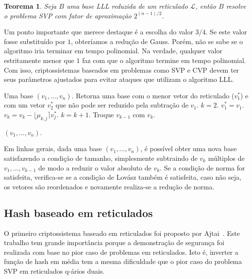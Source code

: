 \documentclass{SBCbookchapter}
\newtheorem{theorem}{Teorema}{\bfseries}{\itshape}
\begin{document}
\begin{otherlanguage}{brazilian}
\begin{theorem}
Seja $B$ uma base LLL reduzida de um reticulado $\mathcal{L}$, então $B$ resolve o problema SVP com fator de aproximação $2^{(n-1)/2}$. 
\end{theorem}

Um ponto importante que merece destaque é a escolha do valor $3/4$. Se este valor fosse substituído por $1$,  obteríamos a redução de Gauss. Porém, não se sabe se o algoritmo iria terminar em tempo polinomial. Na verdade, qualquer valor estritamente menor que $1$ faz com que o algoritmo termine em tempo polinomial. Com isso, criptossistemas baseados em problemas como SVP e CVP devem ter seus parâmetros ajustados para evitar ataques que utilizam o algoritmo LLL.

\begin{algorithm}
\caption{LLL}
\begin{algorithmic}
\Require Uma base $(v_1, ..., v_n)$.
\Ensure Retorna uma base com o menor vetor do reticulado ($v^*_1$) e com um vetor $v^*_2$ que não pode ser reduzido pela subtração de $v_1$.
\State $k=2$.
\State $v_1^* = v_1$.
\State $v_k = v_k - \lfloor\mu_{k,j}\rceil v^*_j$.
\EndFor
{}
\State $k = k+1$.
\Else
\State Troque $v_{k-1}$ com $v_k$.
\EndIf
\EndWhile

\Return $(v_1, ..., v_n)$.
\end{algorithmic}
\end{algorithm}

Em linhas gerais, dada uma base $(v_1, ..., v_n)$, é possível obter uma nova base satisfazendo a condição de tamanho, simplesmente subtraindo de $v_k$ múltiplos de $v_1, ..., v_{k-1}$ de modo a reduzir o valor absoluto de $v_k$. Se a condição de norma for satisfeita, verifica-se se a condição de Lovász também é satisfeita, caso não seja, os vetores são reordenados e novamente realiza-se a redução de norma. 

\subsection{Hash baseado em reticulados}

O primeiro criptossistema baseado em reticulados foi proposto por Ajtai~\cite{ajtai}. Este trabalho tem grande importância porque a demonstração de segurança foi realizada com base no pior caso de problemas em reticulados. Isto é, inverter a função de hash em média tem a mesma dificuldade que o pior caso do problema SVP em reticulados q-ários duais. 


\end{otherlanguage}
\end{document}
